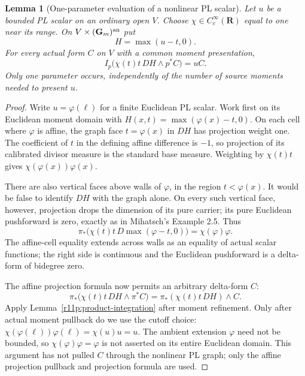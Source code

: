 \documentclass[11pt]{article}
\newtheorem{lemma}[theorem]{Lemma}
\theoremstyle{definition}
\theoremstyle{remark}
\numberwithin{equation}{section}
\begin{document}
\begin{lemma}[One-parameter evaluation of a nonlinear PL scalar]
\label{r11p:one-parameter}
Let $u$ be a bounded PL scalar on an ordinary open $V$.  Choose
$\chi\in C_c^\infty(\mathbf R)$ equal to one near its range.  On
$V\times(\mathbf G_m)^{\rm an}$ put
\[
                         H=\max(u-t,0).
\]
For every actual form $C$ on $V$ with a common moment presentation,
\[
                  I_p\bigl(\chi(t)t\,DH\wedge p^*C\bigr)=uC.
\tag{MT8}\label{r11p:graph-evaluation}
\]
Only one parameter occurs, independently of the number of source
moments needed to present $u$.
\end{lemma}

\begin{proof}
Write $u=\varphi(\ell)$ for a finite Euclidean PL scalar.  Work first
on its Euclidean moment domain with $H(x,t)=\max(\varphi(x)-t,0)$.
On each cell where $\varphi$ is affine, the graph face $t=\varphi(x)$
in $DH$ has projection weight one.  The coefficient of $t$ in the
defining affine difference is $-1$, so projection of its calibrated
divisor measure is the standard base measure.  Weighting by $\chi(t)t$
gives $\chi(\varphi(x))\varphi(x)$.

There are also vertical faces above walls of $\varphi$, in the region
$t<\varphi(x)$.  It would be false to identify $DH$ with the graph
alone.  On every such vertical face, however, projection drops the
dimension of its pure carrier; its pure Euclidean pushforward is
zero, exactly as in Mihatsch's Example 2.5.  Thus
\[
               \pi_*\bigl(\chi(t)t\,D\max(\varphi-t,0)\bigr)
                                  =\chi(\varphi)\varphi.
\]
The affine-cell equality extends across walls as an equality of
actual scalar functions; the right side is continuous and the
Euclidean pushforward is a delta-form of bidegree zero.

The affine projection formula now permits an arbitrary delta-form
$C$:
\[
 \pi_*\bigl(\chi(t)t\,DH\wedge\pi^*C\bigr)
       =\pi_*(\chi(t)t\,DH)\wedge C.
\]
Apply Lemma~\ref{r11p:product-integration} after moment refinement.
Only after actual moment pullback do we use the cutoff choice:
$\chi(\varphi(\ell))\varphi(\ell)=\chi(u)u=u$.
The ambient extension $\varphi$ need not be bounded, so
$\chi(\varphi)\varphi=\varphi$ is not asserted on its entire
Euclidean domain.
This argument has not pulled $C$ through the nonlinear PL graph;
only the affine projection pullback and projection formula are used.
\end{proof}
\end{document}
